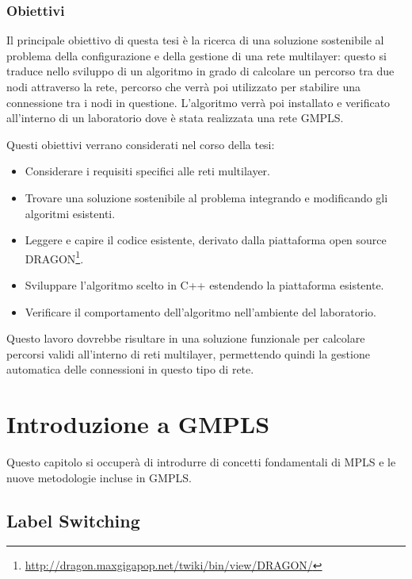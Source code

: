 \documentclass[10pt,a4paper]{report}
\begin{document}
\newpage

\subsubsection*{Obiettivi}

Il principale obiettivo di questa tesi è la ricerca di una soluzione
sostenibile al problema della configurazione e della gestione di una
rete multilayer: questo si traduce nello sviluppo di un algoritmo in
grado di calcolare un percorso tra due nodi attraverso la rete,
percorso che verrà poi utilizzato per stabilire una connessione tra i
nodi in questione. L'algoritmo verrà poi installato e verificato
all'interno di un laboratorio dove è stata realizzata una rete GMPLS.

Questi obiettivi verrano considerati nel corso della tesi:

\begin{itemize}
\item Considerare i requisiti specifici alle reti multilayer.
\item Trovare una soluzione sostenibile al problema integrando e
  modificando gli algoritmi esistenti.
\item Leggere e capire il codice esistente, derivato dalla piattaforma
  open source
  DRAGON\footnote{\url{http://dragon.maxgigapop.net/twiki/bin/view/DRAGON/}}.
\item Sviluppare l'algoritmo scelto in C++ estendendo la piattaforma
  esistente.
\item Verificare il comportamento dell'algoritmo nell'ambiente del
  laboratorio.
\end{itemize}

Questo lavoro dovrebbe risultare in una soluzione funzionale per
calcolare percorsi validi all'interno di reti multilayer, permettendo
quindi la gestione automatica delle connessioni in questo tipo di
rete.

\newpage

\section*{Introduzione a  GMPLS}

Questo capitolo si occuperà di introdurre di concetti fondamentali di
MPLS e le nuove metodologie incluse in GMPLS.

\subsection*{Label Switching}
\end{document}
